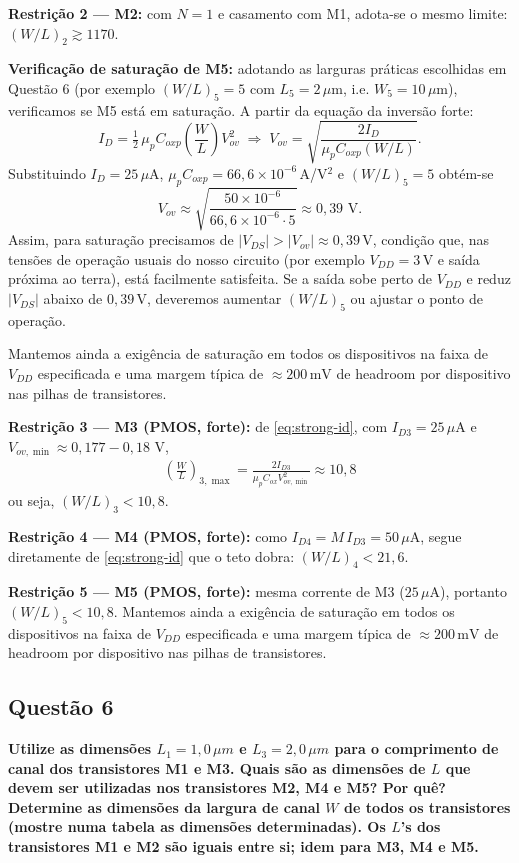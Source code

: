 ﻿\documentclass[12pt,a4paper]{article}
\begin{document}
    	\textbf{Restrição 2 — M2:} com $N=1$ e casamento com M1, adota-se o mesmo limite: $(W/L)_2\gtrsim 1170$.

    	\textbf{Verificação de saturação de M5:} adotando as larguras práticas escolhidas em Questão 6 (por exemplo $(W/L)_5=5$ com $L_5=2\,\mu$m, i.e. $W_5=10\,\mu$m), verificamos se M5 está em saturação. A partir da equação da inversão forte:
\begin{equation}
I_D = \tfrac{1}{2}\,\mu_p C_{ox p}\left(\frac{W}{L}\right)V_{ov}^2 \;\Longrightarrow\; V_{ov} = \sqrt{\frac{2I_D}{\mu_p C_{ox p}(W/L)}}.
\end{equation}
Substituindo $I_D=25\,\mu$A, $\mu_p C_{ox p}=66{,}6\times10^{-6}\,$A/V$^2$ e $(W/L)_5=5$ obtém-se
\begin{equation}
V_{ov}\approx\sqrt{\frac{50\times10^{-6}}{66{,}6\times10^{-6}\cdot 5}}\approx 0{,}39\text{ V}.
\end{equation}
Assim, para saturação precisamos de $|V_{DS}|>|V_{ov}|\approx 0{,}39\,$V, condição que, nas tensões de operação usuais do nosso circuito (por exemplo $V_{DD}=3\,$V e saída próxima ao terra), está facilmente satisfeita. Se a saída sobe perto de $V_{DD}$ e reduz $|V_{DS}|$ abaixo de $0{,}39\,$V, deveremos aumentar $(W/L)_5$ ou ajustar o ponto de operação.

Mantemos ainda a exigência de saturação em todos os dispositivos na faixa de $V_{DD}$ especificada e uma margem típica de $\approx 200\,\text{mV}$ de headroom por dispositivo nas pilhas de transistores.

	\textbf{Restrição 3 — M3 (PMOS, forte):} de \eqref{eq:strong-id}, com $I_{D3}=25\,\mu$A e $V_{ov,\min}\approx 0{,}177{-}0{,}18$ V,
\begin{align}
\left(\frac{W}{L}\right)_{3,\max}=\frac{2 I_{D3}}{\mu_p C_{ox} V_{ov,\min}^2}\approx \boxed{10{,}8}
\end{align}
ou seja, $\boxed{(W/L)_3<10{,}8}$.

	\textbf{Restrição 4 — M4 (PMOS, forte):} como $I_{D4}=M\,I_{D3}=50\,\mu$A, segue diretamente de \eqref{eq:strong-id} que o teto dobra: $\boxed{(W/L)_4<21{,}6}$.

	\textbf{Restrição 5 — M5 (PMOS, forte):} mesma corrente de M3 ($25\,\mu$A), portanto $\boxed{(W/L)_5<10{,}8}$.
Mantemos ainda a exigência de saturação em todos os dispositivos na faixa de $V_{DD}$ especificada e uma margem típica de $\approx 200\,\text{mV}$ de headroom por dispositivo nas pilhas de transistores.

\subsection*{Questão 6}
    	\textbf{Utilize as dimensões $L_1 = 1{,}0\,\mu m$ e $L_3 = 2{,}0\,\mu m$ para o comprimento de canal dos transistores M1 e M3. Quais são as dimensões de $L$ que devem ser utilizadas nos transistores M2, M4 e M5? Por quê? Determine as dimensões da largura de canal $W$ de todos os transistores (mostre numa tabela as dimensões determinadas). Os $L$’s dos transistores M1 e M2 são iguais entre si; idem para M3, M4 e M5.}\\
\end{document}
